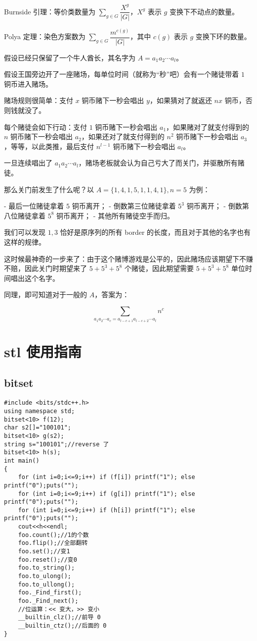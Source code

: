 \documentclass{ctexart}
\begin{document}
Burnside 引理：等价类数量为 $\sum\limits_{g\in G}\dfrac{X^g}{|G|}$，$X^g$ 表示 $g$ 变换下不动点的数量。

Polya 定理：染色方案数为 $\sum\limits_{g\in G}\dfrac{m^{c(g)}}{|G|}$，其中 $c(g)$ 表示 $g$ 变换下环的数量。

假设已经只保留了一个牛人酋长，其名字为 $A=a_1a_2\cdots a_l$。

假设王国旁边开了一座赌场，每单位时间（就称为“秒”吧）会有一个赌徒带着 $1$ 铜币进入赌场。

赌场规则很简单：支付 $x$ 铜币赌下一秒会唱出 $y$，如果猜对了就返还 $nx$ 铜币，否则钱就没了。

每个赌徒会如下行动：支付 $1$ 铜币赌下一秒会唱出 $a_1$，如果赌对了就支付得到的 $n$ 铜币赌下一秒会唱出 $a_2$，如果还对了就支付得到的 $n^2$ 铜币赌下一秒会唱出 $a_3$，等等，以此类推，最后支付 $n^{l-1}$ 铜币赌下一秒会唱出 $a_l$。

一旦连续唱出了 $a_1a_2\cdots a_l$，赌场老板就会认为自己亏大了而关门，并驱散所有赌徒。

那么关门前发生了什么呢？以 $A=\{1,4,1,5,1,1,4,1\},n=5$ 为例：

- 最后一位赌徒拿着 $5$ 铜币离开；
- 倒数第三位赌徒拿着 $5^3$ 铜币离开；
- 倒数第八位赌徒拿着 $5^8$ 铜币离开；
- 其他所有赌徒空手而归。

我们可以发现 $1,3$ 恰好是原序列的所有 border 的长度，而且对于其他的名字也有这样的规律。

这时候最神奇的一步来了：由于这个赌博游戏是公平的，因此赌场应该期望下不赚不赔，因此关门时期望来了 $5+5^3+5^8$ 个赌徒，因此期望需要 $5+5^3+5^8$ 单位时间唱出这个名字。

同理，即可知道对于一般的 $A$，答案为：

$$\sum\limits_{a_1a_2\cdots a_c=a_{l-c+1}a_{l-c+2}\cdots a_l} n^c$$


 \newpage

 \section{stl 使用指南}

\subsection{bitset}

\begin{lstlisting}
#include <bits/stdc++.h>
using namespace std;
bitset<10> f(12);
char s2[]="100101";
bitset<10> g(s2);
string s="100101";//reverse 了
bitset<10> h(s);
int main()
{
	for (int i=0;i<=9;i++) if (f[i]) printf("1"); else printf("0");puts("");
	for (int i=0;i<=9;i++) if (g[i]) printf("1"); else printf("0");puts("");
	for (int i=0;i<=9;i++) if (h[i]) printf("1"); else printf("0");puts("");
	cout<<h<<endl;
    foo.count();//1的个数
	foo.flip();//全部翻转
	foo.set();//变1
	foo.reset();//变0
	foo.to_string();
	foo.to_ulong();
	foo.to_ullong();
	foo._Find_first();
	foo._Find_next();
    //位运算：<< 变大，>> 变小
    __builtin_clz();//前导 0
    __builtin_ctz();//后面的 0
}
\end{lstlisting}
\end{document}
